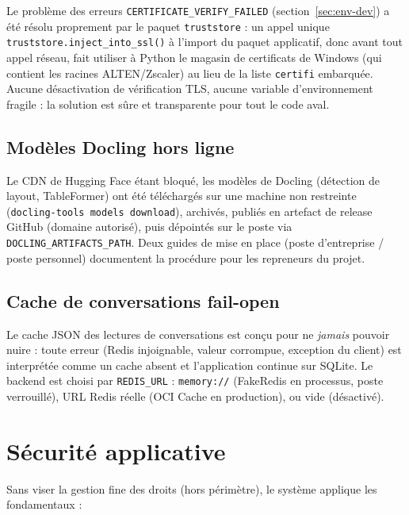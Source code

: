 Le problème des erreurs \texttt{CERTIFICATE\_VERIFY\_FAILED} (section~\ref{sec:env-dev})
a été résolu proprement par le paquet \texttt{truststore} : un appel unique
\texttt{truststore.inject\_into\_ssl()} à l'import du paquet applicatif, donc avant tout
appel réseau, fait utiliser à Python le magasin de certificats de Windows (qui contient
les racines ALTEN/Zscaler) au lieu de la liste \texttt{certifi} embarquée. Aucune
désactivation de vérification TLS, aucune variable d'environnement fragile : la solution
est sûre et transparente pour tout le code aval.

\subsection{Modèles Docling hors ligne}

Le CDN de Hugging Face étant bloqué, les modèles de Docling (détection de layout,
TableFormer) ont été téléchargés sur une machine non restreinte
(\texttt{docling-tools models download}), archivés, publiés en artefact de release GitHub
(domaine autorisé), puis dépointés sur le poste via \texttt{DOCLING\_ARTIFACTS\_PATH}. Deux
guides de mise en place (poste d'entreprise / poste personnel) documentent la procédure
pour les repreneurs du projet.

\subsection{Cache de conversations fail-open}

Le cache JSON des lectures de conversations est conçu pour ne \emph{jamais} pouvoir nuire :
toute erreur (Redis injoignable, valeur corrompue, exception du client) est interprétée
comme un cache absent et l'application continue sur SQLite. Le backend est choisi par
\texttt{REDIS\_URL} : \texttt{memory://} (FakeRedis en processus, poste verrouillé),
URL Redis réelle (OCI Cache en production), ou vide (désactivé).

\section{Sécurité applicative}
\label{sec:securite}

Sans viser la gestion fine des droits (hors périmètre), le système applique les
fondamentaux :

